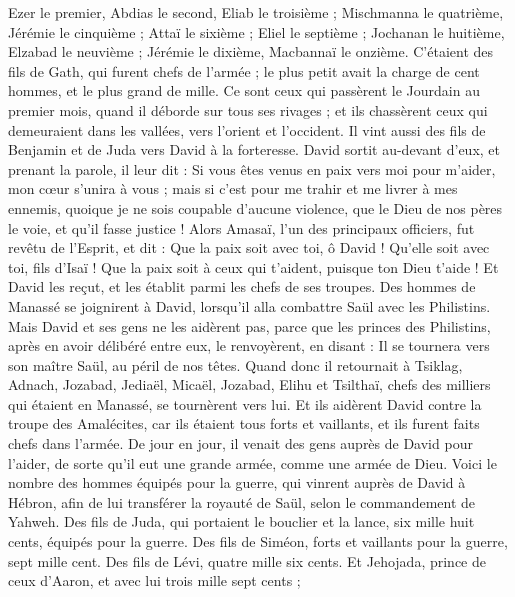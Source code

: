 \begin{multicols}{2}
Ezer le premier, Abdias le second, Eliab le troisième ;
Mischmanna le quatrième, Jérémie le cinquième ;
Attaï le sixième ; Eliel le septième ;
Jochanan le huitième, Elzabad le neuvième ;
Jérémie le dixième, Macbannaï le onzième.
C’étaient des fils de Gath, qui furent chefs de l'armée ; le plus petit avait la charge de cent hommes, et le plus grand de mille.
Ce sont ceux qui passèrent le Jourdain au premier mois, quand il déborde sur tous ses rivages ; et ils chassèrent ceux qui demeuraient dans les vallées, vers l'orient et l'occident.
Il vint aussi des fils de Benjamin et de Juda vers David à la forteresse.
David sortit au-devant d'eux, et prenant la parole, il leur dit : Si vous êtes venus en paix vers moi pour m'aider, mon cœur s’unira à vous ; mais si c'est pour me trahir et me livrer à mes ennemis, quoique je ne sois coupable d'aucune violence, que le Dieu de nos pères le voie, et qu'il fasse justice !
Alors Amasaï, l’un des principaux officiers, fut revêtu de l’Esprit, et dit : Que la paix soit avec toi, ô David ! Qu'elle soit avec toi, fils d'Isaï ! Que la paix soit à ceux qui t'aident, puisque ton Dieu t'aide ! Et David les reçut, et les établit parmi les chefs de ses troupes.
Des hommes de Manassé se joignirent à David, lorsqu’il alla combattre Saül avec les Philistins. Mais David et ses gens ne les aidèrent pas, parce que les princes des Philistins, après en avoir délibéré entre eux, le renvoyèrent, en disant : Il se tournera vers son maître Saül, au péril de nos têtes.
Quand donc il retournait à Tsiklag, Adnach, Jozabad, Jediaël, Micaël, Jozabad, Elihu et Tsilthaï, chefs des milliers qui étaient en Manassé, se tournèrent vers lui.
Et ils aidèrent David contre la troupe des Amalécites, car ils étaient tous forts et vaillants, et ils furent faits chefs dans l'armée.
De jour en jour, il venait des gens auprès de David pour l'aider, de sorte qu'il eut une grande armée, comme une armée de Dieu.
Voici le nombre des hommes équipés pour la guerre, qui vinrent auprès de David à Hébron, afin de lui transférer la royauté de Saül, selon le commandement de Yahweh.
Des fils de Juda, qui portaient le bouclier et la lance, six mille huit cents, équipés pour la guerre.
Des fils de Siméon, forts et vaillants pour la guerre, sept mille cent.
Des fils de Lévi, quatre mille six cents.
Et Jehojada, prince de ceux d'Aaron, et avec lui trois mille sept cents ;

\end{multicols}
